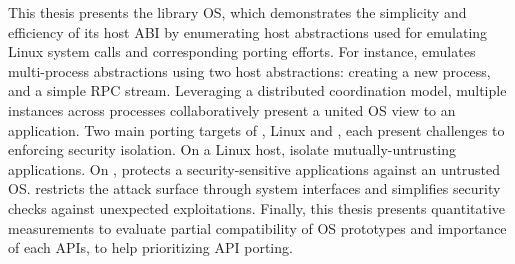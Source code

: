 This thesis presents the \graphene{} library OS, which demonstrates
the simplicity and efficiency of its host ABI
by enumerating host abstractions used for emulating
Linux system calls
and corresponding porting efforts.
For instance, \graphene{} emulates multi-process abstractions %
using two host abstractions:
creating a new process, and a simple RPC stream.
Leveraging a distributed coordination model, multiple \graphene{} instances across processes collaboratively present a united OS view to an application.
Two main porting targets of \graphene{}, 
Linux and \sgx{},
each present challenges to enforcing security isolation.
On a Linux host, \graphene{} %
isolate mutually-untrusting applications.
On \sgx{}, \graphene{} protects a security-sensitive applications %
against an untrusted OS.
\graphene{} restricts the attack surface through system interfaces and simplifies security checks against unexpected exploitations.
Finally, this thesis presents quantitative measurements to evaluate
partial compatibility of OS prototypes
and importance of each APIs, to help prioritizing API porting.

 












